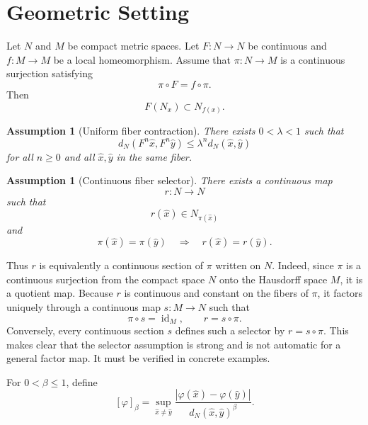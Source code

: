 \documentclass[11pt,a4paper]{article}
\newtheorem{assumption}[theorem]{Assumption}
\begin{document}
\section{Geometric Setting}\label{sec:geom}

Let $N$ and $M$ be compact metric spaces. Let $F:N\to N$ be continuous and
$f:M\to M$ be a local homeomorphism. Assume that $\pi:N\to M$ is a
continuous surjection satisfying
\begin{equation}
    \pi\circ F=f\circ\pi.
\end{equation}
Then
\begin{equation}
    F(N_x)\subset N_{f(x)}.
    \label{eq:fiber-map}
\end{equation}

\begin{assumption}[Uniform fiber contraction]
There exists $0<\lambda<1$ such that
\[
d_N(F^n\hat x,F^n\hat y)
\leq\lambda^n d_N(\hat x,\hat y)
\]
for all $n\geq0$ and all $\hat x,\hat y$ in the same fiber.
\end{assumption}

\begin{assumption}[Continuous fiber selector]
\label{ass:selector}
There exists a continuous map
\[
r:N\to N
\]
such that
\begin{equation}
r(\hat x)\in N_{\pi(\hat x)}
\end{equation}
and
\begin{equation}
\pi(\hat x)=\pi(\hat y)
\quad\Longrightarrow\quad
r(\hat x)=r(\hat y).
\end{equation}
\end{assumption}

Thus $r$ is equivalently a continuous section of $\pi$ written on $N$.
Indeed, since $\pi$ is a continuous surjection from the compact space $N$
onto the Hausdorff space $M$, it is a quotient map. Because $r$ is continuous
and constant on the fibers of $\pi$, it factors uniquely through a continuous
map $s:M\to N$ such that
\[
\pi\circ s=\operatorname{id}_M,
\qquad
r=s\circ\pi.
\]
Conversely, every continuous section $s$ defines such a selector by
$r=s\circ\pi$. This makes clear that the selector assumption is strong and is
not automatic for a general factor map. It must be verified in concrete
examples.

For $0<\beta\leq1$, define
\[
[\varphi]_\beta
=
\sup_{\hat x\neq\hat y}
\frac{|\varphi(\hat x)-\varphi(\hat y)|}
{d_N(\hat x,\hat y)^\beta}.
\]
\end{document}
